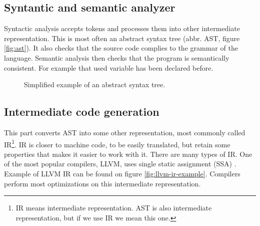 \subsection{Syntantic and semantic analyzer}
Syntactic analysis accepts tokens and processes them into other intermediate
representation. This is most often an abstract syntax tree (abbr. AST, figure
\ref{fig:ast}). It also checks that the source code complies to the grammar of
the language. Semantic analysis then checks that the program is semantically
consistent. For example that used variable has been declared before.

\begin{figure}\label{fig:ast}
    \centering
    \caption{Simplified example of an abstract syntax tree.}
    \label{fig:astgraph}
\end{figure}
 
\subsection{Intermediate code generation}
This part converts AST into some other representation, most commonly called
IR\footnote{IR means intermediate representation. AST is also intermediate
representation, but if we use IR we mean this one.}. IR is closer to machine
code, to be easily translated, but retain some properties that makes it easier
to work with it. There are many types of IR. One of the most popular compilers,
LLVM, uses single static assignment (SSA) \cite{llvm}. Example of LLVM IR can
be found on figure \ref{fig:llvm-ir-example}. Compilers perform most
optimizations on this intermediate representation. 

